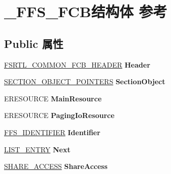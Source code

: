 \hypertarget{struct___f_f_s___f_c_b}{}\section{\+\_\+\+F\+F\+S\+\_\+\+F\+C\+B结构体 参考}
\label{struct___f_f_s___f_c_b}
\subsection*{Public 属性}
\begin{DoxyCompactItemize}
\item 
\mbox{\label{struct___f_f_s___f_c_b_a8e15760e990e2d47e22c0e77ffe1e9fb}} 
\hyperlink{struct___f_s_r_t_l___c_o_m_m_o_n___f_c_b___h_e_a_d_e_r}{F\+S\+R\+T\+L\+\_\+\+C\+O\+M\+M\+O\+N\+\_\+\+F\+C\+B\+\_\+\+H\+E\+A\+D\+ER} {\bfseries Header}
\item 
\mbox{\label{struct___f_f_s___f_c_b_ad71cecf9b6e14cbac80dbbcc9af23d7d}} 
\hyperlink{struct___s_e_c_t_i_o_n___o_b_j_e_c_t___p_o_i_n_t_e_r_s}{S\+E\+C\+T\+I\+O\+N\+\_\+\+O\+B\+J\+E\+C\+T\+\_\+\+P\+O\+I\+N\+T\+E\+RS} {\bfseries Section\+Object}
\item 
\mbox{\label{struct___f_f_s___f_c_b_a3c54a58d3b480f834a13dc4bdc1fdb5a}} 
E\+R\+E\+S\+O\+U\+R\+CE {\bfseries Main\+Resource}
\item 
\mbox{\label{struct___f_f_s___f_c_b_acba6490ff4a2b42e30d042001d75fbf1}} 
E\+R\+E\+S\+O\+U\+R\+CE {\bfseries Paging\+Io\+Resource}
\item 
\mbox{\label{struct___f_f_s___f_c_b_a124cc932efbd6c2aadea1ba2a07f8339}} 
\hyperlink{struct___f_f_s___i_d_e_n_t_i_f_i_e_r}{F\+F\+S\+\_\+\+I\+D\+E\+N\+T\+I\+F\+I\+ER} {\bfseries Identifier}
\item 
\mbox{\label{struct___f_f_s___f_c_b_a64decf2b142f0e003e43f777bf0ed1e1}} 
\hyperlink{struct___l_i_s_t___e_n_t_r_y}{L\+I\+S\+T\+\_\+\+E\+N\+T\+RY} {\bfseries Next}
\item 
\mbox{\label{struct___f_f_s___f_c_b_af7ea2a401fe0c9797d555a437577cd49}} 
\hyperlink{struct___s_h_a_r_e___a_c_c_e_s_s}{S\+H\+A\+R\+E\+\_\+\+A\+C\+C\+E\+SS} {\bfseries Share\+Access}

\end{DoxyCompactItemize}
